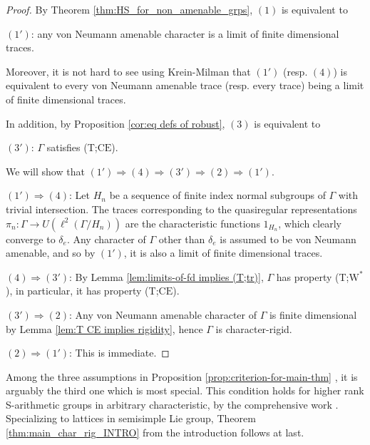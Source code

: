 \documentclass[11pt]{amsart}
\theoremstyle{definition}
\theoremstyle{remark}
\theoremstyle{definition}
\begin{document}
\begin{proof}
    By Theorem \ref{thm:HS_for_non_amenable_grps}, $(1)$ is equivalent to
    
    $(1')$: any von Neumann amenable character is a limit of finite dimensional traces. 
    
    Moreover, it is not hard to see using Krein-Milman that  $(1')$ (resp. $(4)$) is equivalent to  every von Neumann amenable trace (resp. every trace) being a limit of finite dimensional traces. 
    
    In addition, by Proposition \ref{cor:eq defs of robust}, $(3)$ is equivalent to 
    
    $(3')$: $\Gamma$ satisfies (T;$\mathrm{CE}$).
    
    We will show that $(1')\Rightarrow(4)\Rightarrow(3')\Rightarrow(2)\Rightarrow(1')$.

    $(1')\Rightarrow (4)$: Let $H_n$ be a sequence of finite index normal subgroups of $\Gamma$ with trivial intersection. The traces corresponding to the quasiregular representations $\pi_n:\Gamma\to U(\ell^2(\Gamma/H_n))$ are the characteristic functions $1_{H_n}$, which clearly converge to $\delta_e$. Any character of $\Gamma$ other than $\delta_e$ is assumed to be von Neumann amenable, and so by $(1')$, it is also a limit of finite dimensional traces. 
    
    $(4)\Rightarrow (3')$: By Lemma \ref{lem:limits-of-fd implies (T;tr)}, $\Gamma$ has property (T;$\mathrm{W}^*$), in particular, it has property (T;$\mathrm{CE}$). 

    $(3')\Rightarrow (2)$: Any von Neumann amenable character of $\Gamma$ is finite dimensional by Lemma \ref{lem:T CE implies rigidity}, hence $\Gamma$ is character-rigid. 

    $(2)\Rightarrow(1')$: This is immediate. 
\end{proof}

Among the three assumptions in Proposition \ref{prop:criterion-for-main-thm} , it is arguably the third one which is most special. 
This condition holds for higher rank S-arithmetic groups in arbitrary characteristic, by the comprehensive work \cite{BBHP,BBH}. Specializing to lattices in semisimple Lie group,  Theorem \ref{thm:main_char_rig_INTRO} from the introduction follows at last.
\end{document}
